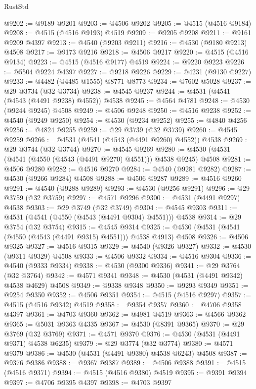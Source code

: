 \begin{lexlean}{RustStd}
\begin{coremodule}
{\begin{coremodule}
{{{{{{{{{{{{{{{{{{{{{{{{{{{{{{{{{{{{{{{{{{{{{{{{{{{{{{{@9202 := @9189 @9201
@9203 := @4506 @9202
@9205 := @4515 (@4516 @9184)
@9208 := @4515 (@4516 @9193) @4519
@9209 := @9205 @9208
@9211 := @9161 @9209 @4397
@9213 := @4540 (@9203 @9211)
@9216 := @4530 (@9180 @9213) @4508
@9217 := @9173 @9216
@9218 := @4506 @9217
@9220 := @4515 (@4516 @9134)
@9223 := @4515 (@4516 @9177) @4519
@9224 := @9220 @9223
@9226 := @5504 @9224 @4397
@9227 := @9218 @9226
@9229 := @4231 (@9130 @9227)
@9233 := @4482 (@4485 @1555) @8771 @8773
@9234 := @7602 @5028
@9237 := @29 @3734 (@32 @3734)
@9238 := @4545 @9237
@9244 := @4531 (@4541 (@4543 (@4491 @9238) @4552)) @4538
@9245 := @4564 @4781
@9248 := @4530 (@9244 @9245) @4508
@9249 := @4506 @9248
@9250 := @4516 @9238
@9252 := @4540 (@9249 @9250)
@9254 := @4530 (@9234 @9252)
@9255 := @4840 @4256
@9256 := @4824 @9255
@9259 := @29 @3739 (@32 @3739)
@9260 := @4545 @9259
@9266 := @4531 (@4541 (@4543 (@4491 @9260) @4552)) @4538
@9269 := @29 @3744 (@32 @3744)
@9270 := @4545 @9269
@9280 := @4530 (@4531 (@4541 (@4550 (@4543 (@4491 @9270) @4551))) @4538 @9245) @4508
@9281 := @4506 @9280
@9282 := @4516 @9270
@9284 := @4540 (@9281 @9282)
@9287 := @4530 (@9266 @9284) @4508
@9288 := @4506 @9287
@9289 := @4516 @9260
@9291 := @4540 (@9288 @9289)
@9293 := @4530 (@9256 @9291)
@9296 := @29 @3759 (@32 @3759)
@9297 := @4571 @9296
@9300 := @4531 (@4491 @9297) @4538
@9303 := @29 @3749 (@32 @3749)
@9304 := @4545 @9303
@9311 := @4531 (@4541 (@4550 (@4543 (@4491 @9304) @4551))) @4538
@9314 := @29 @3754 (@32 @3754)
@9315 := @4545 @9314
@9325 := @4530 (@4531 (@4541 (@4550 (@4543 (@4491 @9315) @4551))) @4538 @4913) @4508
@9326 := @4506 @9325
@9327 := @4516 @9315
@9329 := @4540 (@9326 @9327)
@9332 := @4530 (@9311 @9329) @4508
@9333 := @4506 @9332
@9334 := @4516 @9304
@9336 := @4540 (@9333 @9334)
@9338 := @4530 (@9300 @9336)
@9341 := @29 @3764 (@32 @3764)
@9342 := @4571 @9341
@9348 := @4530 (@4531 (@4491 @9342) @4538 @4629) @4508
@9349 := @9338 @9348
@9350 := @9293 @9349
@9351 := @9254 @9350
@9352 := @4506 @9351
@9354 := @4515 (@4516 @9297)
@9357 := @4515 (@4516 @9342) @4519
@9358 := @9354 @9357
@9360 := @4706 @9358 @4397
@9361 := @4703 @9360
@9362 := @4981 @4519
@9363 := @4566 @9362
@9365 := @5031 @9363 @4335
@9367 := @4530 (@8391 @9365)
@9370 := @29 @3769 (@32 @3769)
@9371 := @4571 @9370
@9376 := @4530 (@4531 (@4491 @9371) @4538 @6235)
@9379 := @29 @3774 (@32 @3774)
@9380 := @4571 @9379
@9386 := @4530 (@4531 (@4491 @9380) @4538 @6243) @4508
@9387 := @9376 @9386
@9388 := @9367 @9387
@9389 := @4506 @9388
@9391 := @4515 (@4516 @9371)
@9394 := @4515 (@4516 @9380) @4519
@9395 := @9391 @9394
@9397 := @4706 @9395 @4397
@9398 := @4703 @9397
}}}}}}}}}}}}}}}}}}}}}}}}}}}}}}}}}}}}}}}}}}}}}}}}}}}}}}}
\end{coremodule}}
\end{coremodule}
\end{lexlean}

